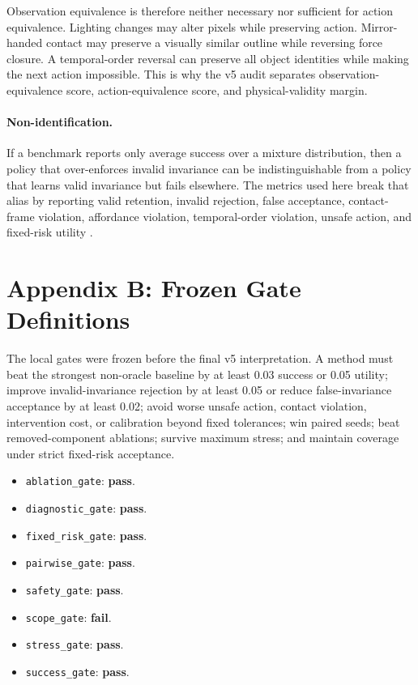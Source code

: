 \documentclass{article}
\begin{document}
Observation equivalence is therefore neither necessary nor sufficient for action equivalence. Lighting changes may alter pixels while preserving action. Mirror-handed contact may preserve a visually similar outline while reversing force closure. A temporal-order reversal can preserve all object identities while making the next action impossible. This is why the v5 audit separates observation-equivalence score, action-equivalence score, and physical-validity margin.

\paragraph{Non-identification.} If a benchmark reports only average success over a mixture distribution, then a policy that over-enforces invalid invariance can be indistinguishable from a policy that learns valid invariance but fails elsewhere. The metrics used here break that alias by reporting valid retention, invalid rejection, false acceptance, contact-frame violation, affordance violation, temporal-order violation, unsafe action, and fixed-risk utility \citep{cohen2016group,tobin2017domain,arjovsky2019invariant,zeng2020transporter,mandlekar2021robomimic}.


\section{Appendix B: Frozen Gate Definitions}
The local gates were frozen before the final v5 interpretation. A method must beat the strongest non-oracle baseline by at least 0.03 success or 0.05 utility; improve invalid-invariance rejection by at least 0.05 or reduce false-invariance acceptance by at least 0.02; avoid worse unsafe action, contact violation, intervention cost, or calibration beyond fixed tolerances; win paired seeds; beat removed-component ablations; survive maximum stress; and maintain coverage under strict fixed-risk acceptance.

\begin{itemize}
\item \texttt{ablation\_gate}: \textbf{pass}.
\item \texttt{diagnostic\_gate}: \textbf{pass}.
\item \texttt{fixed\_risk\_gate}: \textbf{pass}.
\item \texttt{pairwise\_gate}: \textbf{pass}.
\item \texttt{safety\_gate}: \textbf{pass}.
\item \texttt{scope\_gate}: \textbf{fail}.
\item \texttt{stress\_gate}: \textbf{pass}.
\item \texttt{success\_gate}: \textbf{pass}.
\end{itemize}
\end{document}
